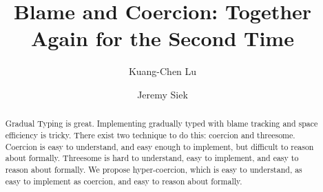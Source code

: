 \documentclass[acmsmall,review,anonymous]{acmart}\settopmatter{printfolios=true,printccs=false,printacmref=false}
\begin{document}
\title{Blame and Coercion: Together Again for the Second Time}


\author{Kuang-Chen Lu}



\author{Jeremy Siek}



\begin{abstract}
	Gradual Typing is great. Implementing gradually typed with blame tracking 
	and space efficiency is tricky. There exist two technique to do this: 
	coercion and threesome. Coercion is easy to understand, and easy enough to 
	implement, but difficult to reason about formally. Threesome is hard to 
	understand, easy to implement, and easy to reason about formally. We 
	propose hyper-coercion, which is easy to understand, as easy to implement 
	as coercion, and easy to reason about formally.
\end{abstract}
\end{document}
